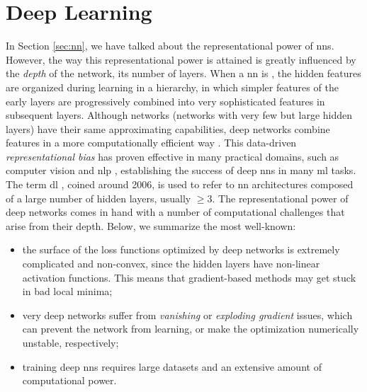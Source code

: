 \section{Deep Learning}\label{sec:deep-learning}
In Section \ref{sec:nn}, we have talked about the representational power of \glspl{nn}. However, the way this representational power is attained is greatly influenced by the \emph{depth} of the network, \ie its number of layers. When a \gls{nn} is , the hidden features are organized during learning in a hierarchy, in which simpler features of the early layers are progressively combined into very sophisticated features in subsequent layers. Although  networks (networks with very few but large hidden layers) have their same approximating capabilities, deep networks combine features in a more computationally efficient way \citep{bengio2009deeparch}. This data-driven \emph{representational bias} has proven effective in many practical domains, such as computer vision \citep{krizhevsky2017imagenet} and \gls{nlp} \citep{vaswani2017transformer}, establishing the success of deep \glspl{nn} in many \gls{ml} tasks. The term \gls{dl} \citep{goodfellow2016dl}, coined around 2006, is used to refer to \gls{nn} architectures composed of a large number of hidden layers, usually $\geq 3$. The representational power of deep networks comes in hand with a number of computational challenges that arise from their depth. Below, we summarize the most well-known:
\begin{itemize}
    \item the surface of the loss functions optimized by deep networks is extremely complicated and non-convex, since the hidden layers have non-linear activation functions. This means that gradient-based methods may get stuck in bad local minima;
    \item very deep networks suffer from \emph{vanishing} or \emph{exploding gradient} issues, which can prevent the network from learning, or make the optimization numerically unstable, respectively;
    \item training deep \glspl{nn} requires large datasets and an extensive amount of computational power.
\end{itemize}
